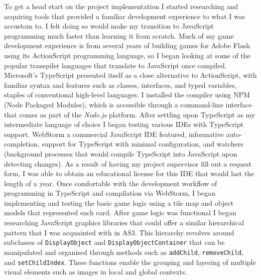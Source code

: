 \documentclass[final]{cmpreport}
\begin{document}
To get a head start on the project implementation I started researching and acquiring tools that provided a familiar development experience to what I was accustom to. I felt doing so would make my transition to JavaScript programming much faster than learning it from scratch. Much of my game development experience is from several years of building games for Adobe Flash using its ActionScript programming language, so I began looking at some of the popular transpiler languages that translate to JavaScript once compiled. Microsoft's TypeScript presented itself as a close alternative to ActionScript, with familiar syntax and features such as classes, interfaces, and typed variables, staples of conventional high-level languages. I installed the compiler using NPM (Node Packaged Modules), which is accessible through a command-line interface that comes as part of the \textit{Node.js} platform. After settling upon TypeScript as my intermediate language of choice I began testing various IDEs with TypeScript support. WebStorm a commercial JavaScript IDE featured, informative auto-completion, support for TypeScript with minimal configuration, and watchers (background processes that would compile TypeScript into JavaScript upon detecting changes). As a result of having my project supervisor fill out a request form, I was able to obtain an educational license for this IDE that would last the length of a year. Once comfortable with the development workflow of programming in TypeScript and compilation via WebStorm, I began implementing and testing the basic game logic using a tile map and object models that represented each card. After game logic was functional I began researching JavaScript graphics libraries that could offer a similar hierarchical pattern that I was acquainted with in AS3. This hierarchy revolves around subclasses of \texttt{DisplayObject} and \texttt{DisplayObjectContainer} that can be manipulated and organised through methods such as \texttt{addChild}, \texttt{removeChild}, and \texttt{setChildIndex}. These functions enable the grouping and layering of multiple visual elements such as images in local and global contexts.
\end{document}
